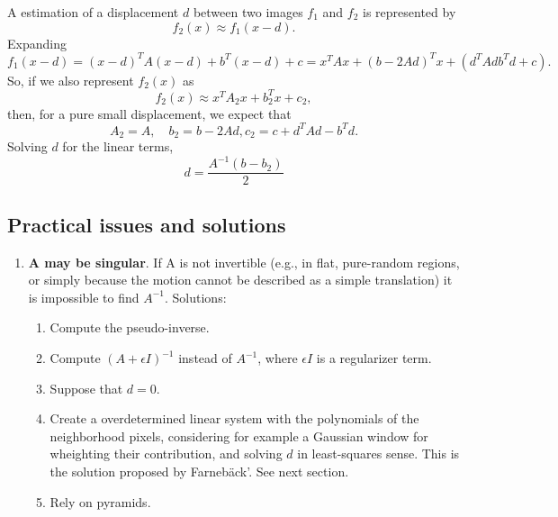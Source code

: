 A estimation of a displacement $d$ between two images $f_1$ and $f_2$ is represented by
\begin{equation}
  f_2(x) \approx f_1(x-d).
\end{equation}
Expanding
\begin{equation}
  f_1(x-d) = (x-d)^TA(x-d) + b^T(x-d) + c = x^TAx + (b-2Ad)^Tx + (d^TAdb^Td+c).
\end{equation}
So, if we also represent $f_2(x)$ as
\begin{equation}
  f_2(x) \approx x^TA_2x + b_2^Tx + c_2,
\end{equation}
then, for a pure small displacement, we expect that
\begin{equation}
  A_2 = A,\quad b_2 = b-2Ad, c_2=c + d^TAd-b^Td.
\end{equation}
Solving $d$ for the linear terms,
\begin{equation}
  d=\frac{A^{-1}(b-b_2)}{2}
\end{equation}

\subsection{Practical issues and solutions}
\begin{enumerate}
\item \textbf{A may be singular}. If A is not invertible (e.g., in flat, pure-random regions, or simply because the motion cannot be described as a simple translation) it is impossible to find $A^{-1}$. Solutions:
  \begin{enumerate}
  \item Compute the pseudo-inverse.
  \item Compute $(A+\epsilon I)^{-1}$ instead of $A^{-1}$, where
    $\epsilon I$ is a regularizer term.
  \item Suppose that $d=0$.
  \item Create a overdetermined linear system with the polynomials of
    the neighborhood pixels, considering for example a Gaussian window
    for wheighting their contribution, and solving $d$ in
    least-squares sense. This is the solution proposed by
    Farneb\"ack'. See next section.
  \item Rely on pyramids.
  \end{enumerate}
\end{enumerate}

